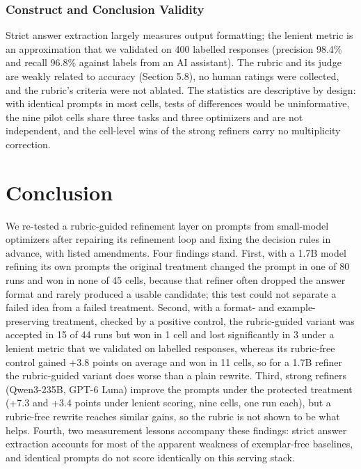 \documentclass{ieeeaccess}
\begin{document}
\subsubsection{Construct and Conclusion Validity}

Strict answer extraction largely measures output formatting; the lenient metric is an approximation that we validated on 400 labelled responses (precision 98.4\% and recall 96.8\% against labels from an AI assistant). The rubric and its judge are weakly related to accuracy (Section 5.8), no human ratings were collected, and the rubric's criteria were not ablated. The statistics are descriptive by design: with identical prompts in most cells, tests of differences would be uninformative, the nine pilot cells share three tasks and three optimizers and are not independent, and the cell-level wins of the strong refiners carry no multiplicity correction.

\section{Conclusion}

We re-tested a rubric-guided refinement layer on prompts from small-model optimizers after repairing its refinement loop and fixing the decision rules in advance, with listed amendments. Four findings stand. First, with a 1.7B model refining its own prompts the original treatment changed the prompt in one of 80 runs and won in none of 45 cells, because that refiner often dropped the answer format and rarely produced a usable candidate; this test could not separate a failed idea from a failed treatment. Second, with a format- and example-preserving treatment, checked by a positive control, the rubric-guided variant was accepted in 15 of 44 runs but won in 1 cell and lost significantly in 3 under a lenient metric that we validated on labelled responses, whereas its rubric-free control gained +3.8 points on average and won in 11 cells, so for a 1.7B refiner the rubric-guided variant does worse than a plain rewrite. Third, strong refiners (Qwen3-235B, GPT-6 Luna) improve the prompts under the protected treatment (+7.3 and +3.4 points under lenient scoring, nine cells, one run each), but a rubric-free rewrite reaches similar gains, so the rubric is not shown to be what helps. Fourth, two measurement lessons accompany these findings: strict answer extraction accounts for most of the apparent weakness of exemplar-free baselines, and identical prompts do not score identically on this serving stack.
\end{document}
